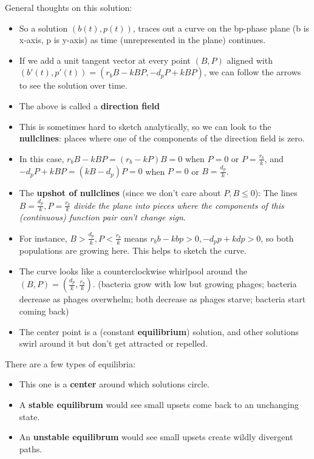 \documentclass[11pt, oneside]{article}   	%
\begin{document}
General thoughts on this solution:
\begin{itemize}
\item So a solution $(b(t), p(t))$, traces out a curve on the bp-phase plane (b is x-axis, p is y-axis) as time (unrepresented in the plane) continues.
\item If we add a unit tangent vector at every point $(B, P)$ aligned with $(b'(t), p'(t)) = ( r_bB - kBP, -d_p P + kBP)$, we can follow the arrows to see the solution over time.
\item The above is called a \textbf{direction field}
\item This is sometimes hard to sketch analytically, so we can look to the \textbf{nullclines}: places where one of the components of the direction field is zero.
\item In this case, $r_bB - kBP = (r_b-kP)B = 0$ when $P = 0$ or $P = \frac{r_b}{k}$, and $-d_p P + kBP = (kB-d_p)P = 0$ when $P=0$ or $B = \frac{d_p}{k}$.
\item The \textbf{upshot of nullclines} (since we don't care about $P, B \leq 0$): The lines $B = \frac{d_p}{k}, P = \frac{r_b}{k}$ \emph{divide the plane into pieces where the components of this (continuous) function pair can't change sign}.  
\item For instance, $B > \frac{d_p}{k}, P <  \frac{r_b}{k}$  means $r_b b - kbp > 0, -d_p p+ kdp > 0$, so both populations are growing here.  This helps to sketch the curve.
\item The curve looks like a counterclockwise whirlpool around the $(B, P) = ( \frac{d_p}{k}, \frac{r_b}{k})$.  (bacteria grow with low but growing phages; bacteria decrease as phages overwhelm; both decrease as phages starve; bacteria start coming back)
\item The center point is a (constant \textbf{equilibrium}) solution, and other solutions swirl around it but don't get attracted or repelled.
\end{itemize}

There are a few types of equilibria:
\begin{itemize}
\item This one is a \textbf{center} around which solutions circle.
\item A \textbf{stable equilibrum} would see small upsets come back to an unchanging state.
\item An \textbf{unstable equilibrum} would see small upsets create wildly divergent paths.


\end{itemize}
\end{document}
